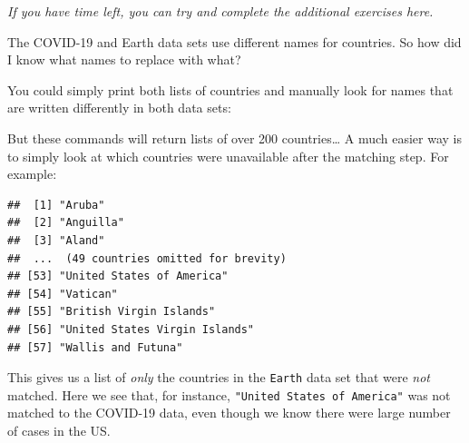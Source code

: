 \documentclass[
]{book}
\newenvironment{Shaded}{\begin{snugshade}}{\end{snugshade}}
\newcommand{\CommentTok}[1]{\textcolor[rgb]{0.56,0.35,0.01}{\textit{#1}}}
\newcommand{\FunctionTok}[1]{\textcolor[rgb]{0.13,0.29,0.53}{\textbf{#1}}}
\newcommand{\NormalTok}[1]{#1}
\newcommand{\OtherTok}[1]{\textcolor[rgb]{0.56,0.35,0.01}{#1}}
\newcommand{\SpecialCharTok}[1]{\textcolor[rgb]{0.81,0.36,0.00}{\textbf{#1}}}
\begin{document}
\emph{If you have time left, you can try and complete the additional exercises here.}

The COVID-19 and Earth data sets use different names for countries. So how did I know what names to replace with what?

You could simply print both lists of countries and manually look for names that are written differently in both data sets:

\begin{Shaded}
\end{Shaded}

But these commands will return lists of over 200 countries\ldots{} A much easier way is to simply look at which countries were unavailable after the matching step. For example:

\begin{Shaded}
\end{Shaded}

\begin{verbatim}
##  [1] "Aruba"                                   
##  [2] "Anguilla"                                
##  [3] "Aland"                                   
##  ...  (49 countries omitted for brevity)                              
## [53] "United States of America"                
## [54] "Vatican"                                 
## [55] "British Virgin Islands"                  
## [56] "United States Virgin Islands"            
## [57] "Wallis and Futuna"
\end{verbatim}

This gives us a list of \emph{only} the countries in the \texttt{Earth} data set that were \emph{not} matched. Here we see that, for instance, \texttt{"United\ States\ of\ America"} was not matched to the COVID-19 data, even though we know there were large number of cases in the US.
\end{document}
